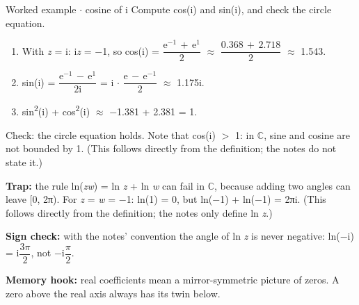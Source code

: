 \documentclass[11pt]{article}
\begin{document}
\begin{keepsection}
\begin{keepsection}
\begin{workedbox}{Worked example \ensuremath{\cdot} cosine of i}
Compute cos(i) and sin(i), and check the circle equation.

\begin{enumerate}
\item With \textit{z} = i: i\textit{z} = \ensuremath{-}1, so cos(i) = {\small\ensuremath{\dfrac{\mathrm{e}^{-1}\, +\, \mathrm{e}^{1}}{2}}} \ensuremath{\approx} {\small\ensuremath{\dfrac{0.368\, +\, 2.718}{2}}} \ensuremath{\approx} 1.543.
\item sin(i) = {\small\ensuremath{\dfrac{\mathrm{e}^{-1}\, -\, \mathrm{e}^{1}}{2\mathrm{i}}}} = i \ensuremath{\cdot} {\small\ensuremath{\dfrac{\mathrm{e}\, -\, \mathrm{e}^{-1}}{2}}} \ensuremath{\approx} 1.175i.
\item sin\textsuperscript{2}(i) + cos\textsuperscript{2}(i) \ensuremath{\approx} \ensuremath{-}1.381 + 2.381 = 1.
\end{enumerate}

Check: the circle equation holds. Note that cos(i) \ensuremath{>} 1: in \ensuremath{\mathbb{C}}, sine and cosine are not bounded by 1. (This follows directly from the definition; the notes do not state it.)
\end{workedbox}

\begin{notebox}\textbf{Trap:} the rule ln(\textit{z}\textit{w}) = ln \textit{z} + ln \textit{w} can fail in \ensuremath{\mathbb{C}}, because adding two angles can leave [0, 2π). For \textit{z} = \textit{w} = \ensuremath{-}1: ln(1) = 0, but ln(\ensuremath{-}1) + ln(\ensuremath{-}1) = 2πi. (This follows directly from the definition; the notes only define ln \textit{z}.)\end{notebox}

\begin{notebox}\textbf{Sign check:} with the notes’ convention the angle of ln \textit{z} is never negative: ln(\ensuremath{-}i) = i{\small\ensuremath{\dfrac{3π}{2}}}, not \ensuremath{-}i{\small\ensuremath{\dfrac{π}{2}}}.\end{notebox}

\begin{notebox}\textbf{Memory hook:} real coefficients mean a mirror-symmetric picture of zeros. A zero above the real axis always has its twin below.\end{notebox}


\end{keepsection}
\end{keepsection}
\end{document}
